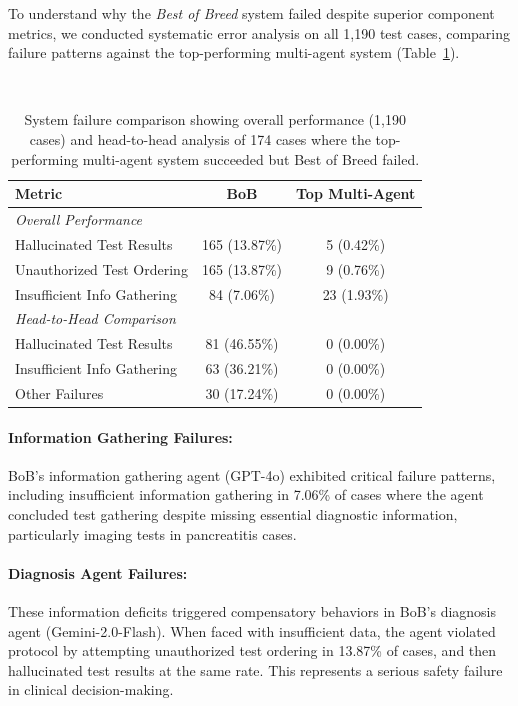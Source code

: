 \documentclass[manuscript, nonacm]{acmart}
\begin{document}
To understand why the \textit{Best of Breed} system failed despite superior component metrics, we conducted systematic error analysis on all 1,190 test cases, comparing failure patterns against the top-performing multi-agent system (Table~\ref{tab:failure_analysis}). 

\ 

\begin{table}[htbp]
\centering
\small
\begin{tabular}{lcc}
\toprule
\textbf{Metric} & \textbf{BoB} & \textbf{Top Multi-Agent} \\
\midrule
\multicolumn{3}{l}{\textit{Overall Performance}} \\
Hallucinated Test Results & 165 (13.87\%) & 5 (0.42\%) \\
Unauthorized Test Ordering & 165 (13.87\%) & 9 (0.76\%) \\
Insufficient Info Gathering & 84 (7.06\%) & 23 (1.93\%) \\
\midrule
\multicolumn{3}{l}{\textit{Head-to-Head Comparison}} \\
Hallucinated Test Results & 81 (46.55\%) & 0 (0.00\%) \\
Insufficient Info Gathering & 63 (36.21\%) & 0 (0.00\%) \\
Other Failures & 30 (17.24\%) &   0 (0.00\%) \\
\bottomrule
\end{tabular}
\caption{System failure comparison showing overall performance (1,190 cases) and head-to-head analysis of 174 cases where the top-performing multi-agent system succeeded but Best of Breed failed.}
\label{tab:failure_analysis}
\end{table}

\paragraph{Information Gathering Failures:}
BoB's information gathering agent (GPT-4o) exhibited critical failure patterns, including insufficient information gathering in 7.06\% of cases where the agent concluded test gathering despite missing essential diagnostic information, particularly imaging tests in pancreatitis cases.

\paragraph{Diagnosis Agent Failures:}
These information deficits triggered compensatory behaviors in BoB's diagnosis agent (Gemini-2.0-Flash). When faced with insufficient data, the agent violated protocol by attempting unauthorized test ordering in 13.87\% of cases, and then hallucinated test results at the same rate. This represents a serious safety failure in clinical decision-making.
\end{document}
